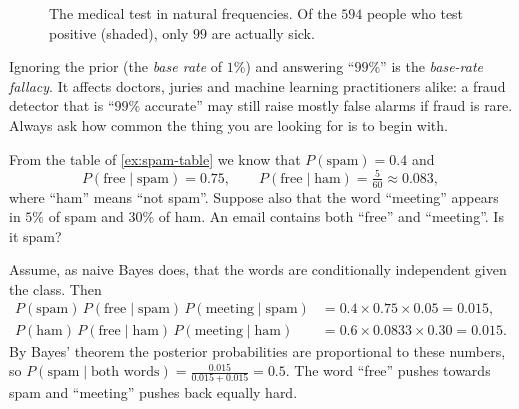 \begin{figure}[htbp]
\centering
{}
\caption{The medical test in natural frequencies. Of the $594$ people who test
  positive (shaded), only $99$ are actually sick.}
\label{fig:bayes-frequencies}
\end{figure}

\begin{pitfall}
Ignoring the prior (the \emph{base rate} of $1\%$) and answering ``$99\%$'' is the
\emph{base-rate fallacy}. It affects doctors, juries and machine learning
practitioners alike: a fraud detector that is ``$99\%$ accurate'' may still raise
mostly false alarms if fraud is rare. Always ask how common the thing you are
looking for is to begin with.
\end{pitfall}

\begin{example}\label{ex:naive-bayes}
From the table of \cref{ex:spam-table} we know that $P(\text{spam}) = 0.4$ and
\[
  P(\text{free} \mid \text{spam}) = 0.75, \qquad
  P(\text{free} \mid \text{ham}) = \tfrac{5}{60} \approx 0.083,
\]
where ``ham'' means ``not spam''. Suppose also that the word ``meeting'' appears
in $5\%$ of spam and $30\%$ of ham. An email contains both ``free'' and
``meeting''. Is it spam?

\sol Assume, as naive Bayes does, that the words are conditionally independent
given the class. Then
\begin{align*}
  P(\text{spam})\,P(\text{free} \mid \text{spam})\,P(\text{meeting} \mid \text{spam})
    &= 0.4\times0.75\times0.05 = 0.015,\\
  P(\text{ham})\,P(\text{free} \mid \text{ham})\,P(\text{meeting} \mid \text{ham})
    &= 0.6\times0.0833\times0.30 = 0.015 .
\end{align*}
By Bayes' theorem the posterior probabilities are proportional to these numbers,
so $P(\text{spam} \mid \text{both words}) = \frac{0.015}{0.015 + 0.015} = 0.5$.
The word ``free'' pushes towards spam and ``meeting'' pushes back equally hard.
\end{example}

